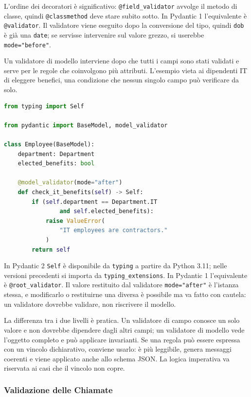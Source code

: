 \documentclass[12pt]{extarticle}
\begin{document}
\noindent L'ordine dei decoratori è significativo: \texttt{@field\_validator} avvolge il metodo di classe, quindi \texttt{@classmethod} deve stare subito sotto. In Pydantic 1 l'equivalente è \texttt{@validator}. Il validatore viene eseguito dopo la conversione del tipo, quindi \texttt{dob} è già una \texttt{date}; se servisse intervenire sul valore grezzo, si userebbe \texttt{mode="before"}.

\noindent Un validatore di modello interviene dopo che tutti i campi sono stati validati e serve per le regole che coinvolgono più attributi. L'esempio vieta ai dipendenti IT di eleggere benefici, una condizione che nessun singolo campo può verificare da solo.

\begin{lstlisting}[language=Python]
from typing import Self

from pydantic import BaseModel, model_validator

class Employee(BaseModel):
    department: Department
    elected_benefits: bool

    @model_validator(mode="after")
    def check_it_benefits(self) -> Self:
        if (self.department == Department.IT
                and self.elected_benefits):
            raise ValueError(
                "IT employees are contractors."
            )
        return self
\end{lstlisting}

\noindent In Pydantic 2 \texttt{Self} è disponibile da \texttt{typing} a partire da Python 3.11; nelle versioni precedenti si importa da \texttt{typing\_extensions}. In Pydantic 1 l'equivalente è \texttt{@root\_validator}. Il valore restituito dal validatore \texttt{mode="after"} è l'istanza stessa, e modificarlo o restituirne una diversa è possibile ma va fatto con cautela: un validatore dovrebbe validare, non riscrivere il modello.

\noindent La differenza tra i due livelli è pratica. Un validatore di campo conosce un solo valore e non dovrebbe dipendere dagli altri campi; un validatore di modello vede l'oggetto completo e può applicare invarianti. Se una regola può essere espressa con un vincolo dichiarativo, conviene usarlo: è più leggibile, genera messaggi coerenti e viene applicato anche allo schema JSON. La logica imperativa va riservata ai casi che il vincolo non copre.

\subsubsection{Validazione delle Chiamate}
\end{document}
